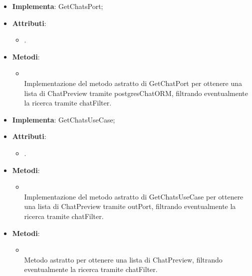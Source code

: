 \documentclass[10pt, a4paper]{article}
\begin{document}
\label{GetChatsPostgresDettaglio}
\begin{itemize}
    \item \textbf{Implementa}: GetChatsPort;
    \item \textbf{Attributi}:
    \begin{itemize}
        \item {}.
    \end{itemize}
    \item \textbf{Metodi}:
    \begin{itemize}
        \item {}\\
        Implementazione del metodo astratto di GetChatPort per ottenere una lista di ChatPreview tramite postgresChatORM, filtrando eventualmente la ricerca tramite chatFilter.
        
    \end{itemize}
\end{itemize}


\label{GetChatsServiceDettaglio}
\begin{itemize}
    \item \textbf{Implementa}: GetChatsUseCase;
    \item \textbf{Attributi}:
    \begin{itemize}
        \item {}.
    \end{itemize}
    \item \textbf{Metodi}:
    \begin{itemize}
        \item {}\\
        Implementazione del metodo astratto di GetChatsUseCase per ottenere una lista di ChatPreview tramite outPort, filtrando eventualmente la ricerca tramite chatFilter.
    \end{itemize}
\end{itemize}


\label{GetChatsUseCaseDettaglio}
\begin{itemize}
    \item \textbf{Metodi}:
    \begin{itemize}
        \item {}\\
        Metodo astratto per ottenere una lista di ChatPreview, filtrando eventualmente la ricerca tramite chatFilter.
    \end{itemize}
\end{itemize}
\end{document}
